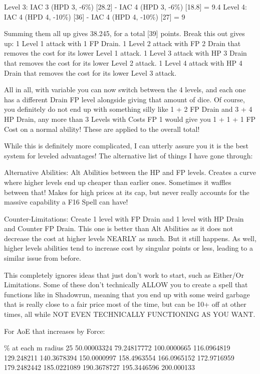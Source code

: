 \begin{multicols*}{2}
	Level 3: IAC 3 (HPD 3, -6\%) [28.2] - IAC 4 (HPD 3, -6\%) [18.8] = 9.4
	Level 4: IAC 4 (HPD 4, -10\%) [36] - IAC 4 (HPD 4, -10\%) [27] = 9
	
	Summing them all up gives 38.245, for a total [39] points.
	Break this out gives up:
	1 Level 1 attack with 1 FP Drain.
	1 Level 2 attack with FP 2 Drain that removes the cost for its lower Level 1 attack.
	1 Level 3 attack with HP 3 Drain that removes the cost for its lower Level 2 attack.
	1 Level 4 attack with HP 4 Drain that removes the cost for its lower Level 3 attack.
	
	All in all, with variable you can now switch between the 4 levels, and each one has a different Drain FP level alongside giving that amount of dice. Of course, you definitely do not end up with something silly like 1 + 2 FP Drain and 3 + 4 HP Drain, any more than 3 Levels with Costs FP 1 would give you 1 + 1 + 1 FP Cost on a normal ability! These are applied to the overall total!
	
	While this is definitely more complicated, I can utterly assure you it is the best system for leveled advantages! The alternative list of things I have gone through:
	
	Alternative Abilities: Alt Abilities between the HP and FP levels. Creates a curve where higher levels end up cheaper than earlier ones. Sometimes it waffles between that! Makes for high prices at its cap, but never really accounts for the massive capability a F16 Spell can have!
	
	Counter-Limitations: Create 1 level with FP Drain and 1 level with HP Drain and Counter FP Drain. This one is better than Alt Abilities as it does not decrease the cost at higher levels NEARLY as much. But it still happens. As well, higher levels abilities tend to increase cost by singular points or less, leading to a similar issue from before.
	
	This completely ignores ideas that just don't work to start, such as Either/Or Limitations. Some of these don't technically ALLOW you to create a spell that functions like in Shadowrun, meaning that you end up with some weird garbage that is really close to a fair price most of the time, but can be 10+ off at other times, all while NOT EVEN TECHNICALLY FUNCTIONING AS YOU WANT.
	
	For AoE that increases by Force:
	
	\% at each m radius
	25
	50.00003324
	79.24817772
	100.0000665
	116.0964819
	129.248211
	140.3678394
	150.0000997
	158.4963554
	166.0965152
	172.9716959
	179.2482442
	185.0221089
	190.3678727
	195.3446596
	200.000133
	

\end{multicols*}

